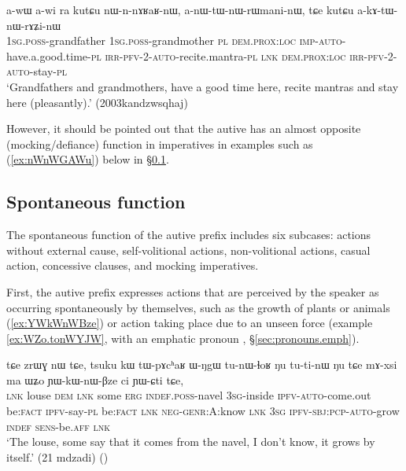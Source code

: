 \begin{exe}
\ex \label{ex:anWtWnWrWmaninW}
\gll a-wɯ a-wi ra kutɕu nɯ-n-nɤʁaʁ-nɯ, a-nɯ-tɯ-nɯ-rɯmani-nɯ, tɕe kutɕu a-kɤ-tɯ-nɯ-rɤʑi-nɯ \\
\textsc{1sg}.\textsc{poss}-grandfather \textsc{1sg}.\textsc{poss}-grandmother \textsc{pl} \textsc{dem}.\textsc{prox}:\textsc{loc} \textsc{imp}-\textsc{auto}-have.a.good.time-\textsc{pl} \textsc{irr}-\textsc{pfv}-2-\textsc{auto}-recite.mantra-\textsc{pl} \textsc{lnk} \textsc{dem}.\textsc{prox}:\textsc{loc} \textsc{irr}-\textsc{pfv}-2-\textsc{auto}-stay-\textsc{pl} \\
\glt `Grandfathers and grandmothers, have a good time here, recite mantras and stay here (pleasantly).' (2003kandzwsqhaj)
\end{exe}

However, it should be pointed out that the autive has an almost opposite (mocking/defiance) function in imperatives in examples such as (\ref{ex:nWnWGAWu}) below in §\ref{sec:autoben.spontaneous}.
 
\subsection{Spontaneous function}  \label{sec:autoben.spontaneous} 
The spontaneous function of the autive prefix includes six subcases: actions without external cause, self-volitional actions, non-volitional actions, casual action, concessive clauses,  and mocking imperatives.

First, the autive prefix expresses actions that are perceived by the speaker as occurring spontaneously by themselves, such as the growth of plants or animals (\ref{ex:YWkWnWBze}) or action taking place due to an unseen force (example \ref{ex:WZo.tonWYJW}, with an emphatic pronoun , §\ref{sec:pronouns.emph}).

\begin{exe}
\ex \label{ex:YWkWnWBze}
\gll tɕe zrɯɣ nɯ tɕe, tsuku kɯ tɯ-pɤcʰaʁ ɯ-ŋgɯ tu-nɯ-ɬoʁ ŋu tu-ti-nɯ ŋu tɕe mɤ-xsi ma ɯʑo ɲɯ-kɯ-nɯ-βze ci ɲɯ-ɕti tɕe, 	\\
\textsc{lnk} louse \textsc{dem} \textsc{lnk} some \textsc{erg} \textsc{indef}.\textsc{poss}-navel \textsc{3sg}-inside \textsc{ipfv}-\textsc{auto}-come.out be:\textsc{fact} \textsc{ipfv}-say-\textsc{pl}  be:\textsc{fact} \textsc{lnk} \textsc{neg}-\textsc{genr}:A:know \textsc{lnk} \textsc{3sg} \textsc{ipfv}-\textsc{sbj}:\textsc{pcp}-\textsc{auto}-grow \textsc{indef} \textsc{sens}-be.\textsc{aff} \textsc{lnk} \\
\glt `The louse, some say that it comes from the navel, I don't know, it grows by itself.' (21 mdzadi) ()
\end{exe}


